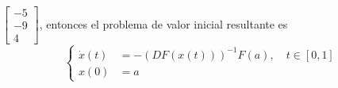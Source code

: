 \begin{frame}
\begin{solution}
\begin{math}
\begin{bmatrix}
				-5 \\
				-9 \\
				4
			\end{bmatrix}
		\end{math},
		entonces el problema de valor inicial resultante es
		\begin{equation*}
			\left\{
			\begin{aligned}
				\dot{x}\left(t\right) & =
				-{\left(DF\left(x\left(t\right)\right)\right)}^{-1}
				F\left(a\right),\quad t\in\left[0,1\right] \\
				x\left(0\right)       & =a
			\end{aligned}
			\right.
		\end{equation*}
	\end{solution}
\end{frame}

